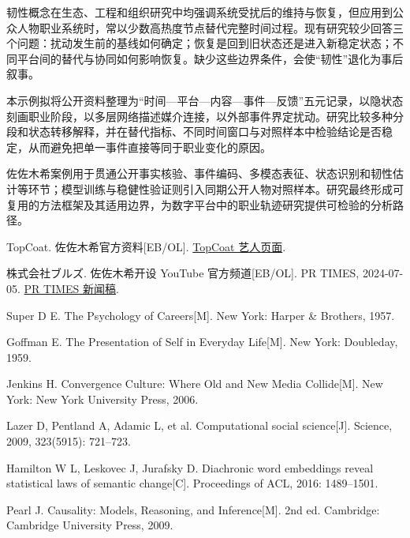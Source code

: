 韧性概念在生态、工程和组织研究中均强调系统受扰后的维持与恢复，但应用到公众人物职业系统时，常以少数高热度节点替代完整时间过程。现有研究较少回答三个问题：扰动发生前的基线如何确定；恢复是回到旧状态还是进入新稳定状态；不同平台间的替代与协同如何影响恢复。缺少这些边界条件，会使“韧性”退化为事后叙事。


本示例拟将公开资料整理为“时间—平台—内容—事件—反馈”五元记录，以隐状态刻画职业阶段，以多层网络描述媒介连接，以外部事件界定扰动。研究比较多种分段和状态转移解释，并在替代指标、不同时间窗口与对照样本中检验结论是否稳定，从而避免把单一事件直接等同于职业变化的原因。

佐佐木希案例用于贯通公开事实核验、事件编码、多模态表征、状态识别和韧性估计等环节；模型训练与稳健性验证则引入同期公开人物对照样本。研究最终形成可复用的方法框架及其适用边界，为数字平台中的职业轨迹研究提供可检验的分析路径。


\begin{enumerate}[label={\textup{[\arabic*]}},leftmargin=*,itemsep=0pt]
  \item TopCoat. 佐佐木希官方资料[EB/OL]. \href{https://topcoat.co.jp/nozomi_sasaki}{TopCoat 艺人页面}.
  \item 株式会社ブルズ. 佐佐木希开设 YouTube 官方频道[EB/OL]. PR TIMES, 2024-07-05. \href{https://prtimes.jp/main/html/rd/p/000000020.000059044.html}{PR TIMES 新闻稿}.
  \item Super D E. The Psychology of Careers[M]. New York: Harper \& Brothers, 1957.
  \item Goffman E. The Presentation of Self in Everyday Life[M]. New York: Doubleday, 1959.
  \item Jenkins H. Convergence Culture: Where Old and New Media Collide[M]. New York: New York University Press, 2006.
  \item Lazer D, Pentland A, Adamic L, et al. Computational social science[J]. Science, 2009, 323(5915): 721--723.
  \item Hamilton W L, Leskovec J, Jurafsky D. Diachronic word embeddings reveal statistical laws of semantic change[C]. Proceedings of ACL, 2016: 1489--1501.
  \item Pearl J. Causality: Models, Reasoning, and Inference[M]. 2nd ed. Cambridge: Cambridge University Press, 2009.
\end{enumerate}
